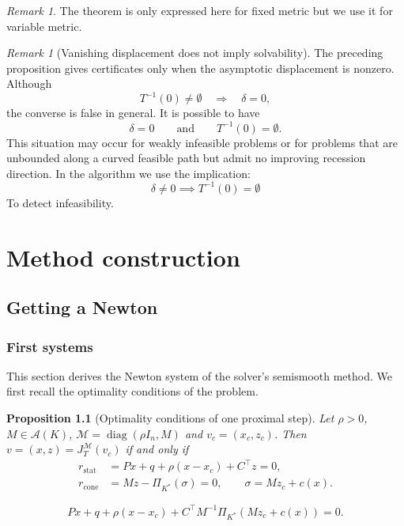 \documentclass[a4paper,11pt]{book}
\theoremstyle{plain}
\newtheorem{proposition}[theorem]{Proposition}
\theoremstyle{definition}
\theoremstyle{remark}
\newtheorem{remark}[theorem]{Remark}
\numberwithin{equation}{chapter}
\numberwithin{algorithm}{chapter}
\newcommand{\proj}[2]{\Pi_{#2}\!\left(#1\right)}
\newcommand{\diag}{\operatorname{diag}}
\begin{document}
	\begin{remark}
		The theorem is only expressed here for fixed metric but we use it for variable metric.
	\end{remark}
	\begin{remark}[Vanishing displacement does not imply solvability]
		The preceding proposition gives certificates only when the asymptotic
		displacement is nonzero. Although
		\[
		T^{-1}(0)\neq\emptyset
		\quad\Longrightarrow\quad
		\delta=0,
		\]
		the converse is false in general. It is possible to have
		\[
		\delta=0
		\qquad\text{and}\qquad
		T^{-1}(0)=\emptyset.
		\]
		This situation may occur for weakly infeasible problems or for problems
		that are unbounded along a curved feasible path but admit no improving
		recession direction. In the algorithm we use the implication:
		$$\delta \neq 0\implies T^{-1}(0) = \emptyset$$
		To detect infeasibility. 
	\end{remark}
	
	\part{Method construction}
	
	\chapter{Getting a Newton}
	
	\section{First systems}
	This section derives the Newton system of the solver's semismooth method. We
	first recall the optimality conditions of the problem.
	
	\begin{proposition}[Optimality conditions of one proximal step]
		Let $\rho>0$, $M\in\mathcal{A}(K)$, $\mathcal{M}=\diag(\rho I_n,M)$ and
		$v_c=(x_c,z_c)$. Then $v=(x,z)=J^{\mathcal{M}}_T(v_c)$ if and only if
		\begin{align}
			r_{\mathrm{stat}}&=Px+q+\rho(x-x_c)+C^\top z=0, \\
			r_{\mathrm{cone}}&=Mz-\proj{\sigma}{K^*}=0,
			\qquad \sigma=Mz_c+c(x) .
		\end{align}
	\end{proposition}
	
	\begin{equation}
		Px+q+\rho(x-x_c)+C^\top M^{-1}\proj{Mz_c+c(x)}{K^*}=0 .
	\end{equation}
	
\end{document}
